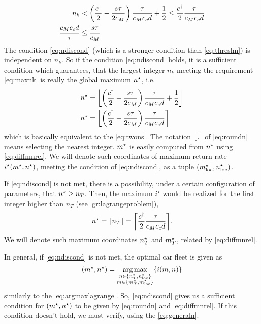 \documentclass[a4paper]{report}
\DeclarePairedDelimiter\floor{\lfloor}{\rfloor}
\DeclarePairedDelimiter\ceil{\lceil}{\rceil}
\DeclarePairedDelimiter{\nint}{\lfloor}{\rceil}
\DeclareMathOperator*{\argmax}{arg\,max}
\begin{document}
\begin{align}
	n_k&<\left(\frac{c^{\dagger}}{2}-\frac{s\tau}{2c_M}\right)\frac{\tau}{c_Mc_c d}+\frac{1}{2} \leq  \frac{c^{\dagger}}{2} \frac{\tau}{c_Mc_cd} \nonumber\\
	\frac{c_Mc_cd}{\tau} &\leq \frac{s\tau}{c_M} \label{eq:ndiscond} 
\end{align}
The condition \autoref{eq:ndiscond} (which is a stronger condition than \autoref{eq:threshn}) is independent on $n_k$. So if the condition \autoref{eq:ndiscond} holds, it is a sufficient condition which guarantees, that the largest integer $n_k$ meeting the requirement \autoref{eq:maxnk} is really the global maximum $n^\star$, i.e.
\begin{align}
	\ns&=\floor*{\left(\frac{\cd}{2}-\frac{s\tau}{2c_M}\right)\frac{\tau}{c_Mc_c d}+\frac{1}{2}}\nonumber\\
	\ns&=\nint*{\left(\frac{\cd}{2}-\frac{s\tau}{2c_M}\right)\frac{\tau}{c_Mc_c d}}\label{eq:roundn}
\end{align}
which is basically equivalent to the \autoref{eq:twons}. The notation $\nint*{.}$ of \autoref{eq:roundn} means selecting the nearest integer. $m^{\star}$ is easily computed from $n^\star$ using \autoref{eq:diffmnrel}. We will denote such coordinates of maximum return rate $i^\star(m^{\star}, n^\star)$, meeting the condition of \autoref{eq:ndiscond}, as a tuple $(m^{\star}_\text{loc},n^\star_\text{loc})$.%

If \autoref{eq:ndiscond} is not met, there is a possibility, under a certain configuration of parameters, that $n^\star \geq n_T$. Then, the maximum $i^\star$ would be realized for the first integer higher than $n_T$ (see \autoref{gr:lagrangeproblem}), 
\begin{equation}
	\ns=\ceil*{n_T}=\ceil*{\frac{\cd}{2} \frac{\tau}{c_Mc_cd}}.	\label{eq:floornt}
\end{equation}
We will denote such maximum coordinates $n^\star_T$ and $m^{\star}_T$, related by \autoref{eq:diffmnrel}.

In general, if \autoref{eq:ndiscond} is not met, the optimal car fleet is given as
\begin{equation}
	(\ms,\ns)=\argmax\limits_{\substack{n\in\{\ns_T, \ns_\text{loc}\} \\ {m\in\{\ms_T, \ms_\text{loc}\}}}} \{i(m,n)\} \label{eq:generaln}
\end{equation}
similarly to the \autoref{eq:argmaxlagrange}. So, \autoref{eq:ndiscond} gives us a sufficient condition for $(m^{\star},n^\star)$ to be given by \autoref{eq:roundn} and \autoref{eq:diffmnrel}. If this condition doesn't hold, we must verify, using the \autoref{eq:generaln}.
\end{document}

